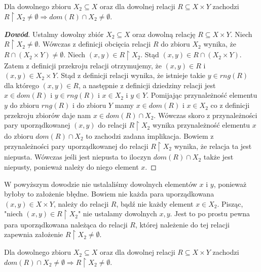 \begin{property}
Dla dowolnego zbioru $X_{2}\subseteq X$ oraz dla dowolnej relacji $R\subseteq X\times Y$ zachodzi $R\upharpoonright X_{2}\ne\emptyset\Rightarrow dom(R)\cap X_{2}\ne\emptyset$.
\end{property}
\begin{proof}[\textbf{Dowód}]
Ustalmy dowolny zbiór $X_{2}\subseteq X$ oraz dowolną relację $R\subseteq X\times Y$. Niech $R\upharpoonright X_{2}\ne\emptyset$. Wówczas z definicji obcięcia relacji $R$ do zbioru $X_{2}$ wynika, że $R\cap(X_{2}\times Y)\ne\emptyset$. Niech $(x,y)\in R\upharpoonright X_{2}$. Stąd $(x,y)\in R\cap(X_{2}\times Y)$. Zatem z definicji przekroju relacji otrzymujemy, że $(x,y)\in R$ i $(x,y)\in X_{2}\times Y$. Stąd z definicji relacji wynika, że istnieje takie $y\in rng(R)$  dla którego $(x,y)\in R$, a następnie z definicji dziedziny relacji jest $x\in dom(R)$ i $y\in rng(R)$ i $x\in X_{2}$ i $y\in Y$. Pomijając przynależność elementu $y$ do zbioru $rng(R)$ i do zbioru $Y$ mamy $x\in dom(R)$ i $x\in X_{2}$ co z definicji przekroju zbiorów daje nam $x\in dom(R)\cap X_{2}$. Wówczas skoro z przynależności pary uporządkowanej $(x,y)$ do relacji $R\upharpoonright X_{2}$ wynika przynależność elementu $x$ do zbioru $dom(R)\cap X_{2}$ to zachodzi zadana implikacja. Bowiem z przynależności pary uporządkowanej do relacji $R\upharpoonright X_{2}$ wynika, że relacja ta jest niepusta. Wówczas jeśli jest niepusta to iloczyn $dom(R)\cap X_{2}$ także jest niepusty, ponieważ należy do niego element $x$.
\end{proof}
\begin{remark}
W powyższym dowodzie nie ustalaliśmy dowolnych elementów $x$ i $y$, ponieważ byłoby to założenie błędne. Bowiem nie każda para uporządkowana $(x,y)\in X\times Y$, należy do relacji $R$, bądź nie każdy
element $x\in X_{2}$. Pisząc, "niech $(x,y)\in R\upharpoonright X_{2}$" nie ustalamy dowolnych $x,y$. Jest to po prostu pewna para uporządkowana należąca do relacji $R$, której należenie do tej relacji zapewnia założenie $R\upharpoonright X_{2}\ne\emptyset$.
\end{remark}
\begin{property}
Dla dowolnego zbioru $X_{2}\subseteq X$ oraz dla dowolnej relacji $R\subseteq X\times Y$ zachodzi $dom(R)\cap X_{2}\ne\emptyset\Rightarrow R\upharpoonright X_{2}\ne\emptyset$.
\end{property}
